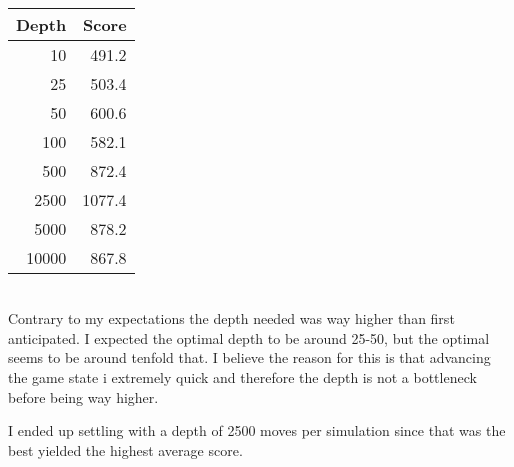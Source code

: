 \noindent \\
\begin{tabular}{ | r | r | }
	\hline
	Depth & Score \\ \hline
	10  & 491.2 \\ \hline
	25  & 503.4 \\ \hline
	50  & 600.6 \\ \hline
	100 & 582.1 \\ \hline
	500 & 872.4 \\ \hline
	2500 & 1077.4 \\ \hline
	5000 & 878.2 \\ \hline
	10000 & 867.8 \\
	\hline
\end{tabular} \\

\noindent
Contrary to my expectations the depth needed was way higher than first anticipated.
I expected the optimal depth to be around 25-50, but the optimal seems to be around tenfold that. I believe the reason for this is that advancing the game state i extremely quick and therefore the depth is not a bottleneck before being way higher.

I ended up settling with a depth of 2500 moves per simulation since that was the best yielded the highest average score.































